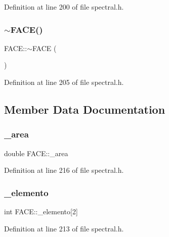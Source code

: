 Definition at line 200 of file spectral.\+h.

\mbox{\label{structFACE_a312735b7baae8686bf238377ff8caf81}} 
\subsubsection{\texorpdfstring{$\sim$\+F\+A\+C\+E()}{~FACE()}}
{\footnotesize\ttfamily F\+A\+C\+E\+::$\sim$\+F\+A\+CE (\begin{DoxyParamCaption}{ }\end{DoxyParamCaption})\hspace{0.3cm}{\ttfamily [inline]}}



Definition at line 205 of file spectral.\+h.



\subsection{Member Data Documentation}
\mbox{\label{structFACE_a47ac2239337038a14e42f2bb8c9416ae}} 
\subsubsection{\texorpdfstring{\+\_\+area}{\_area}}
{\footnotesize\ttfamily double F\+A\+C\+E\+::\+\_\+area}



Definition at line 216 of file spectral.\+h.

\mbox{\label{structFACE_a9eb92fef619b9f6572dad67032f12789}} 
\subsubsection{\texorpdfstring{\+\_\+elemento}{\_elemento}}
{\footnotesize\ttfamily int F\+A\+C\+E\+::\+\_\+elemento\mbox{[}2\mbox{]}}



Definition at line 213 of file spectral.\+h.

\mbox{\label{structFACE_a350498fd21fda2edb4f660a76204f26d}} 
